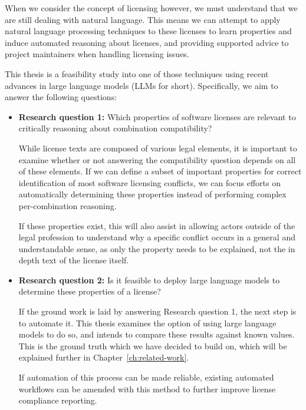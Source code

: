 When we consider the concept of licensing however, we must understand that we are still dealing with natural language. This means we can attempt to apply natural language processing techniques to these licenses to learn properties and induce automated reasoning about licenses, and providing supported advice to project maintainers when handling licensing issues.

This thesis is a feasibility study into one of those techniques using recent advances in large language models (LLMs for short). Specifically, we aim to answer the following questions:

\begin{itemize}
	\item \textbf{Research question 1:} Which properties of software licenses are relevant to critically reasoning about combination compatibility?
	
	While license texts are composed of various legal elements, it is important to examine whether or not answering the compatibility question depends on all of these elements. If we can define a subset of important properties for correct identification of most software licensing conflicts, we can focus efforts on automatically determining these properties instead of performing complex per-combination reasoning.
	
	If these properties exist, this will also assist in allowing actors outside of the legal profession to understand why a specific conflict occurs in a general and understandable sense, as only the property needs to be explained, not the in depth text of the license itself.
	
	\item \textbf{Research question 2:} Is it feasible to deploy large language models to determine these properties of a license?
	
	If the ground work is laid by answering Research question 1, the next step is to automate it. This thesis examines the option of using large language models to do so, and intends to compare these results against known values. This is the ground truth which we have decided to build on, which will be explained further in Chapter~\ref{ch:related-work}.
	
	If automation of this process can be made reliable, existing automated workflows can be amended with this method to further improve license compliance reporting.
\end{itemize}
